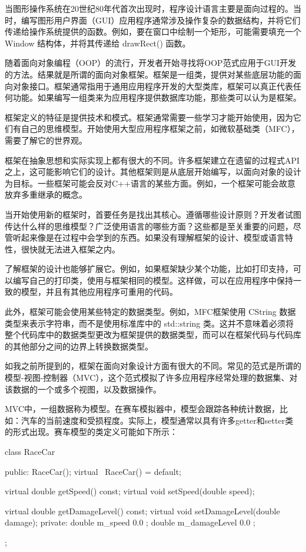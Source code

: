 
当图形操作系统在20世纪80年代首次出现时，程序设计语言主要是面向过程的。当时，编写图形用户界面（GUI）应用程序通常涉及操作复杂的数据结构，并将它们传递给操作系统提供的函数。例如，要在窗口中绘制一个矩形，可能需要填充一个 Window 结构体，并将其传递给 drawRect() 函数。

随着面向对象编程（OOP）的流行，开发者开始寻找将OOP范式应用于GUI开发的方法。结果就是所谓的面向对象框架。框架是一组类，提供对某些底层功能的面向对象接口。框架通常指用于通用应用程序开发的大型类库，框架可以真正代表任何功能。如果编写一组类来为应用程序提供数据库功能，那些类可以认为是框架。


框架定义的特征是提供技术和模式。框架通常需要一些学习才能开始使用，因为它们有自己的思维模型。开始使用大型应用程序框架之前，如微软基础类（MFC），需要了解它的世界观。

框架在抽象思想和实际实现上都有很大的不同。许多框架建立在遗留的过程式API之上，这可能影响它们的设计。其他框架则是从底层开始编写，以面向对象的设计为目标。一些框架可能会反对C++语言的某些方面。例如，一个框架可能会故意放弃多重继承的概念。

当开始使用新的框架时，首要任务是找出其核心。遵循哪些设计原则？开发者试图传达什么样的思维模型？广泛使用语言的哪些方面？这些都是至关重要的问题，尽管听起来像是在过程中会学到的东西。如果没有理解框架的设计、模型或语言特性，很快就无法进入框架之内。

了解框架的设计也能够扩展它。例如，如果框架缺少某个功能，比如打印支持，可以编写自己的打印类，使用与框架相同的模型。这样做，可以在应用程序中保持一致的模型，并且有其他应用程序可重用的代码。

此外，框架可能会使用某些特定的数据类型。例如，MFC框架使用 CString 数据类型来表示字符串，而不是使用标准库中的 std::string 类。这并不意味着必须将整个代码库中的数据类型更改为框架提供的数据类型，而可以在框架代码与代码库的其他部分之间的边界上转换数据类型。


如我之前所提到的，框架在面向对象设计方面有很大的不同。常见的范式是所谓的模型-视图-控制器（MVC），这个范式模拟了许多应用程序经常处理的数据集、对该数据的一个或多个视图，以及数据操作。

MVC中，一组数据称为模型。在赛车模拟器中，模型会跟踪各种统计数据，比如：汽车的当前速度和受损程度。实际上，模型通常以具有许多getter和setter类的形式出现。赛车模型的类定义可能如下所示：

\begin{cpp}
class RaceCar
{
    public:
        RaceCar();
        virtual ~RaceCar() = default;

        virtual double getSpeed() const;
        virtual void setSpeed(double speed);

        virtual double getDamageLevel() const;
        virtual void setDamageLevel(double damage);
    private:
        double m_speed { 0.0 };
        double m_damageLevel { 0.0 };
};
\end{cpp}

